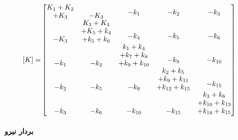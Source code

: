 \begin{equation}\label{Eq.stiffness_matrix_dimensional_combined}
\begin{aligned}
[K] =& 
\begin{bmatrix}
\shortstack{$K_1 + K_2$ \\ $+ K_3$} & -K_3 & \shortstack{$-k_1$ \\ \,} & \shortstack{$-k_2$ \\ \,} & \shortstack{$-k_3$ \\ \,} \\
-K_3 & \shortstack{$K_3 + K_4$ \\ $+ K_5 + k_4$ \\ $+ k_5 + k_6$} & \shortstack{$-k_4$ \\ \,} & \shortstack{$-k_5$ \\ \,} & \shortstack{$-k_6$ \\ \,} \\
-k_1 & -k_2 & \shortstack{$k_1 + k_4$ \\ $+ k_7 + k_8$ \\ $+ k_9 + k_{10}$} & \shortstack{$-k_9$ \\ \,} & \shortstack{$-k_{10}$ \\ \,} \\
-k_2 & -k_5 & -k_9 & \shortstack{$k_2 + k_5$ \\ $+ k_9 + k_{11}$ \\ $+ k_{12} + k_{15}$} & \shortstack{$-k_{15}$ \\ \,} \\
-k_3 & -k_{6} & -k_{10} & -k_{15} & \shortstack{$k_3 + k_6$ \\ $+ k_{10} + k_{13}$ \\ $+ k_{14} + k_{15}$}
\end{bmatrix}
\end{aligned}
\end{equation}

\paragraph{بردار نيرو}


